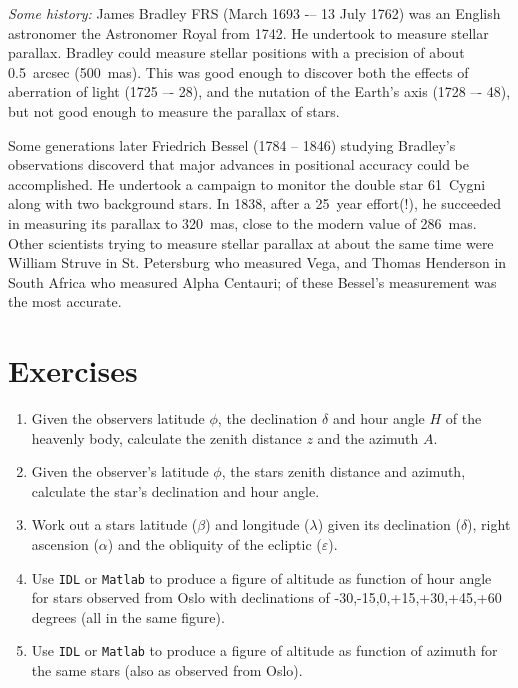 {\it Some history:} James Bradley FRS (March 1693 -– 13 July 1762) was an English astronomer the Astronomer Royal from 1742. He undertook to measure stellar parallax. Bradley could measure stellar positions with a precision of about 0.5~arcsec (500~mas). This was good enough to
discover both the effects of aberration of light (1725 –- 28), and the nutation of the Earth's axis (1728 –- 48), but not good enough to measure the parallax of stars.

Some generations later Friedrich Bessel (1784 -- 1846) studying Bradley's observations discoverd
that major advances in positional accuracy could be accomplished. He undertook a campaign to
monitor the double star 61~Cygni along with two background stars. In 1838, after a 25~year effort(!), he succeeded in measuring its parallax to 320~mas, close to the modern value of 
286~mas. Other scientists trying to measure stellar parallax at about the same time were
William Struve in St. Petersburg who measured Vega, and Thomas Henderson in South Africa who measured Alpha Centauri; of these Bessel's measurement was the most accurate.

\section{Exercises}

\begin{enumerate}
\item Given the observers latitude $\phi$, the declination $\delta$
  and hour angle $H$ of the heavenly body, calculate the zenith
  distance $z$ and the azimuth $A$.
\item Given the observer's latitude $\phi$, the stars zenith distance
  and azimuth, calculate the star's declination and hour angle.
\item Work out a stars latitude ($\beta$) and longitude ($\lambda$)
  given its declination ($\delta$), right ascension ($\alpha$) and the
  obliquity of the ecliptic ($\varepsilon$).
\item Use {\tt IDL} or {\tt Matlab} to produce a figure of 
altitude as function of
hour angle for stars observed from Oslo with declinations of
-30,-15,0,+15,+30,+45,+60 degrees (all in the same figure).
\item Use {\tt IDL} or {\tt Matlab} 
to produce a figure of altitude as function of
azimuth for the same stars (also as observed from Oslo).
\end{enumerate}
